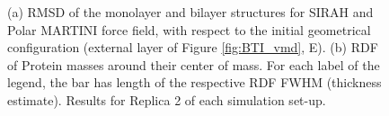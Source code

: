 \begin{figure}[h!]
    \caption[(SI) Replica 2: Comparison of monolayer and bilayer structural properties]{(a) RMSD of the monolayer and bilayer structures for SIRAH and Polar MARTINI force field, with respect to the initial geometrical configuration (external layer of Figure \ref{fig:BTI_vmd}, E). (b) RDF of Protein masses around their center of mass. For each label of the legend, the bar has length of the respective RDF FWHM (thickness estimate). Results for Replica 2 of each simulation set-up.}
\label{fig:mono_bi2}
\end{figure}

